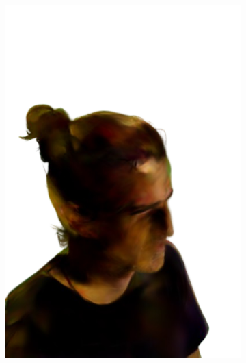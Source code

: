 \begin{figure}[ht]
\begin{subfigure}{0.2\linewidth}
		\includegraphics[width=\textwidth]{Figures/failed/cowboy/17_render-removebg-preview.png}
	\end{subfigure}
	\begin{subfigure}{0.2\linewidth}

\end{subfigure}
\end{figure}
